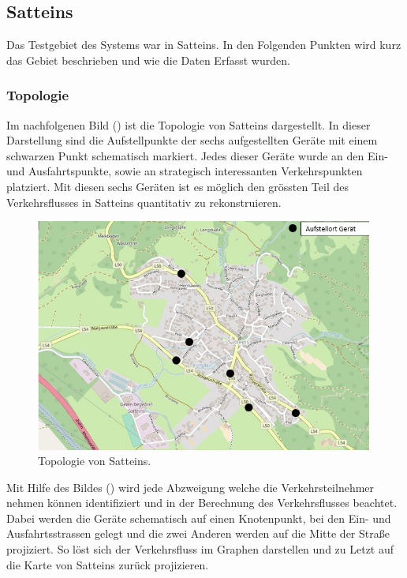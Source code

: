 \subsection{Satteins}
Das Testgebiet des Systems war in Satteins. In den Folgenden Punkten wird kurz das Gebiet beschrieben und wie die Daten Erfasst wurden.
\subsubsection{Topologie}
Im nachfolgenen Bild () ist die Topologie von Satteins dargestellt. In dieser Darstellung sind die Aufstellpunkte der sechs aufgestellten Geräte mit einem schwarzen Punkt schematisch markiert. Jedes dieser Geräte wurde an den Ein- und Ausfahrtspunkte, sowie an strategisch interessanten Verkehrspunkten platziert. Mit diesen sechs Geräten ist es möglich den grössten Teil des Verkehrsflusses in Satteins quantitativ zu rekonstruieren. 

\begin{figure}[H]
  \centering
  \includegraphics[width=0.99\textwidth]{Resultate/Satteins.jpg} 
  \caption{Topologie von Satteins.}
  \label{bSatteins}
\end{figure}

Mit Hilfe des Bildes () wird jede Abzweigung welche die Verkehrsteilnehmer nehmen können identifiziert und in der Berechnung des Verkehrsflusses beachtet. Dabei werden die Geräte schematisch auf einen Knotenpunkt, bei den Ein- und Ausfahrtsstrassen gelegt und die zwei Anderen werden auf die Mitte der Straße projiziert. So löst sich der Verkehrsfluss im Graphen darstellen und zu Letzt auf die Karte von Satteins zurück projizieren.

